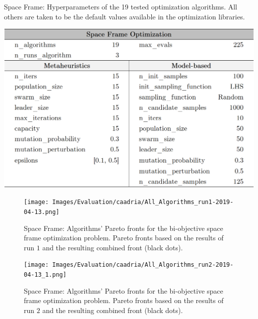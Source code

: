 
\begin{table}[h!]
	\centering
	\label{table:configurationsspaceframe}
	\caption[Space Frame: Hyperparameters of the tested optimization optimization algorithms]{Space Frame: Hyperparameters of the 19 tested optimization algorithms. All others are taken to be the default values available in the optimization libraries.}
	\includegraphics[width=\textwidth]{tables_and_code/appendices/configs_space_frame.PNG}
\end{table}

\begin{figure}[h!]
	\centering
	\texttt{[image: Images/Evaluation/caadria/All\_Algorithms\_run1-2019-04-13.png]}
	\caption[Space Frame: Pareto Fronts for run 1]{Space Frame: Algorithms' Pareto fronts for the bi-objective space frame optimization problem. Pareto fronts based on the results of run $1$ and the resulting combined front (black dots).}
	\label{table:spaceframerun1}
\end{figure}

\begin{figure}[h!]
	\centering
	\texttt{[image: Images/Evaluation/caadria/All\_Algorithms\_run2-2019-04-13\_1.png]}
	\caption[Space Frame: Pareto Fronts for run 2]{Space Frame: Algorithms' Pareto fronts for the bi-objective space frame optimization problem. Pareto fronts based on the results of run $2$ and the resulting combined front (black dots).}
	\label{table:spaceframesrun2}
\end{figure}

